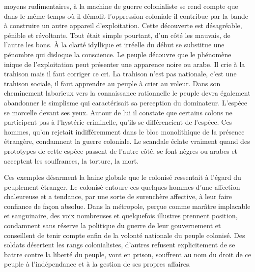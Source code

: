 \documentclass[french,twoside]{book} %
\begin{document}
moyens rudimentaires, à la machine de guerre colonialiste se rend compte que dans le même temps où il démolit l’oppression coloniale il contribue par la bande à construire   un autre appareil d’exploitation. Cette découverte est désagréable, pénible et révoltante. Tout était simple pourtant, d’un côté les mauvais, de l’autre les bons. À la clarté idyllique et irréelle du début se substitue une pénombre qui disloque la conscience. Le peuple découvre que le phénomène inique de l’exploitation peut présenter une apparence noire ou arabe. Il crie à la trahison mais il faut corriger ce cri. La trahison n’est pas nationale, c’est une trahison sociale, il faut apprendre au peuple à crier au voleur. Dans son cheminement laborieux vers la connaissance rationnelle le peuple devra également abandonner le simplisme qui caractérisait sa perception du dominateur. L’espèce se morcelle devant ses yeux. Autour de lui il constate que certains colons ne participent pas à l’hystérie criminelle, qu’ils se différencient de l’espèce. Ces hommes, qu’on rejetait indifféremment dans le bloc monolithique de la présence étrangère, condamnent la guerre coloniale. Le scandale éclate vraiment quand des prototypes de cette espèce passent de l’autre côté, se font nègres ou arabes et acceptent les souffrances, la torture, la mort.\par
\bigbreak
\noindent Ces exemples désarment la haine globale que le colonisé ressentait à l’égard du peuplement étranger. Le colonisé entoure ces quelques hommes d’une affection chaleureuse et a tendance, par une sorte de surenchère affective, à leur faire confiance de façon absolue. Dans la métropole, perçue comme marâtre implacable et sanguinaire, des voix nombreuses et quelquefois illustres prennent position, condamnent sans réserve la politique du guerre de leur gouvernement et conseillent de tenir compte enfin de la volonté nationale du peuple colonisé. Des soldats désertent les rangs colonialistes, d’autres refusent explicitement de se battre contre la liberté du peuple, vont en prison, souffrent au nom du droit de ce peuple à l’indépendance et à la gestion de ses propres affaires.\par
\end{document}
